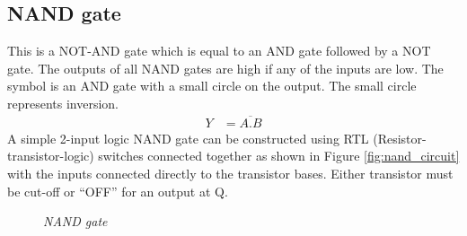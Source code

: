 	\subsection{NAND gate}
	This is a NOT-AND gate which is equal to an AND gate followed by a NOT gate. The outputs of all NAND gates are high if any of the inputs are low. The symbol is an AND gate with a small circle on the output. The small circle represents inversion.
	\begin{align*}
		Y &= \overline{A . B}
	\end{align*}
	A simple 2-input logic NAND gate can be constructed using RTL (Resistor-transistor-logic) switches connected together as shown in Figure \ref{fig:nand_circuit} with the inputs connected directly to the transistor bases. Either transistor must be cut-off or “OFF” for an output at Q.
	\begin{figure}[ht]
		\centering 
		\hfill
		\hfill
		\caption{\textit{NAND gate}}
	\end{figure}
	
	
